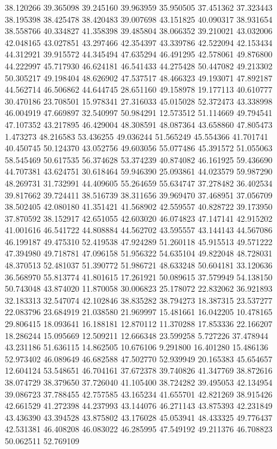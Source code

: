 38.120266
39.365098
39.245160
39.963959
35.950505
37.451362
37.323443
38.195398
38.425478
38.420483
39.007698
43.151825
40.090317
38.931654
38.558766
40.334827
41.358398
39.485804
38.066352
39.210021
43.032006
42.048165
43.027851
43.297466
42.354397
43.339786
42.522094
42.153434
44.312921
39.915572
44.345494
47.635294
46.491295
42.578061
49.876800
44.222997
45.717930
46.624181
46.541433
44.275428
50.447082
49.213302
50.305217
49.198404
48.626902
47.537517
48.466323
49.193071
47.892187
44.562714
46.506862
44.644745
28.651160
49.158978
19.177113
40.610777
30.470186
23.708501
15.978341
27.316033
45.015028
52.372473
43.338998
46.004919
47.669897
32.540997
50.984291
12.573512
51.114669
49.794541
47.107352
43.217895
46.429004
48.308591
48.087364
43.658860
47.805473
1.473273
48.216583
53.436255
49.036244
51.565249
45.554366
41.701741
40.450745
50.124370
43.052756
49.603056
55.077486
45.391572
51.055063
58.545469
50.617535
56.374628
53.374239
40.874082
46.161925
59.436690
44.707381
43.624751
30.618464
59.946390
25.093861
44.023579
59.987290
48.269731
31.732991
44.409605
55.264659
55.634747
37.278482
36.402534
39.817662
39.724411
38.516739
38.311656
39.969470
37.468951
37.056709
38.502405
42.080180
41.351421
41.568902
42.559557
40.828722
39.173950
37.870592
38.152917
42.651055
42.603020
46.074823
47.147141
42.915202
41.001616
46.541722
44.808884
44.562702
43.595557
43.144143
44.567086
46.199187
49.475310
52.419538
47.924289
51.260118
45.915513
49.571222
47.394980
49.718781
47.096158
51.956322
54.635104
49.822048
48.728031
48.370513
52.481037
51.390772
51.986721
48.633248
50.604181
33.120636
36.568970
55.813774
41.801615
17.261921
50.089615
37.579949
54.138150
50.743048
43.874020
11.870058
30.006823
25.178072
22.832062
36.921893
32.183313
32.547074
42.102846
38.835282
38.794273
18.387315
23.537277
22.083796
23.684919
21.038580
21.969997
15.481661
16.042205
10.478165
29.806415
18.093641
16.188181
12.870112
11.370288
17.853336
22.166207
18.286244
15.095669
12.509211
12.666348
23.599258
5.727226
37.478944
43.231186
51.636115
14.862505
10.676106
9.291800
16.401280
15.486136
52.973402
46.089649
46.682588
47.502770
52.939949
20.165383
45.654657
12.604124
53.548651
46.704161
37.672378
39.740826
41.347769
38.872616
38.074729
38.379650
37.726040
41.105400
38.724282
39.495053
42.134954
39.086723
37.788455
42.757585
43.165234
41.655701
42.821269
38.915426
42.661529
41.272398
44.237993
43.144076
46.271143
43.875393
42.231849
43.436390
43.394528
43.875802
43.176028
45.053941
48.433325
49.776437
42.531381
46.408208
46.083022
46.285995
47.549192
49.211376
46.708823
50.062511
52.769109
